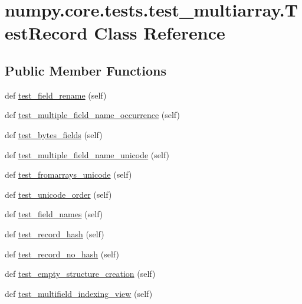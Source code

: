\hypertarget{classnumpy_1_1core_1_1tests_1_1test__multiarray_1_1TestRecord}{}\section{numpy.\+core.\+tests.\+test\+\_\+multiarray.\+Test\+Record Class Reference}
\label{classnumpy_1_1core_1_1tests_1_1test__multiarray_1_1TestRecord}
\subsection*{Public Member Functions}
\begin{DoxyCompactItemize}
\item 
def \hyperlink{classnumpy_1_1core_1_1tests_1_1test__multiarray_1_1TestRecord_a46cbcbdd9ffabdcb53a45bd6ce996858}{test\+\_\+field\+\_\+rename} (self)
\item 
def \hyperlink{classnumpy_1_1core_1_1tests_1_1test__multiarray_1_1TestRecord_a77617a9e7091ba27296cd09655f6bb0e}{test\+\_\+multiple\+\_\+field\+\_\+name\+\_\+occurrence} (self)
\item 
def \hyperlink{classnumpy_1_1core_1_1tests_1_1test__multiarray_1_1TestRecord_a86d17d772aa1c2b2d9a5802be74e40f2}{test\+\_\+bytes\+\_\+fields} (self)
\item 
def \hyperlink{classnumpy_1_1core_1_1tests_1_1test__multiarray_1_1TestRecord_a877b453130a27f7e9aa5b23835e3acd8}{test\+\_\+multiple\+\_\+field\+\_\+name\+\_\+unicode} (self)
\item 
def \hyperlink{classnumpy_1_1core_1_1tests_1_1test__multiarray_1_1TestRecord_a9515a1007827252b8e401f7f068b2cfe}{test\+\_\+fromarrays\+\_\+unicode} (self)
\item 
def \hyperlink{classnumpy_1_1core_1_1tests_1_1test__multiarray_1_1TestRecord_a6e3c183265dce372d6997d8c3c28ba0e}{test\+\_\+unicode\+\_\+order} (self)
\item 
def \hyperlink{classnumpy_1_1core_1_1tests_1_1test__multiarray_1_1TestRecord_a3b38bdc943c9248c4c81054d585c15e0}{test\+\_\+field\+\_\+names} (self)
\item 
def \hyperlink{classnumpy_1_1core_1_1tests_1_1test__multiarray_1_1TestRecord_adb7de99dc18f0c97dd9ea08f41560434}{test\+\_\+record\+\_\+hash} (self)
\item 
def \hyperlink{classnumpy_1_1core_1_1tests_1_1test__multiarray_1_1TestRecord_ac6c5de56a0c8e60bf1d3faa0680220ee}{test\+\_\+record\+\_\+no\+\_\+hash} (self)
\item 
def \hyperlink{classnumpy_1_1core_1_1tests_1_1test__multiarray_1_1TestRecord_a9e56257d895d7ce8fc43c40dd287a9c3}{test\+\_\+empty\+\_\+structure\+\_\+creation} (self)
\item 
def \hyperlink{classnumpy_1_1core_1_1tests_1_1test__multiarray_1_1TestRecord_a78ed97f6d1e77ba76cb5bbd0a2f2eb2a}{test\+\_\+multifield\+\_\+indexing\+\_\+view} (self)
\end{DoxyCompactItemize}


